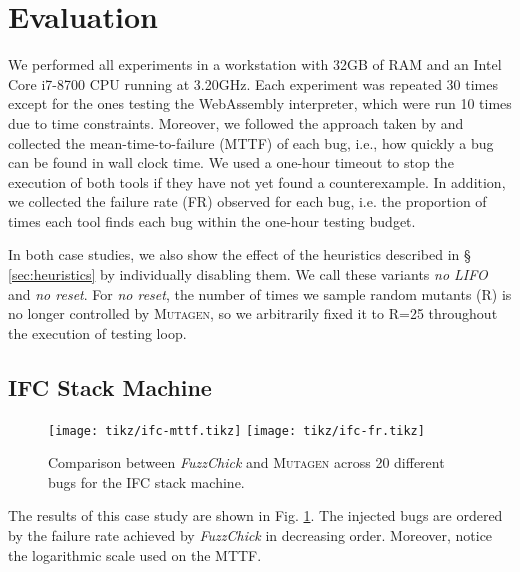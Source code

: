 \documentclass[sigconf,review,anonymous]{acmart}
\newcommand{\fuzzchick}{\textit{FuzzChick}\xspace}
\newcommand{\mutagen}{\textsc{Mutagen}\xspace}
\begin{document}

\section{Evaluation}
\label{sec:evaluation}

We performed all experiments in a workstation with 32GB of RAM and an Intel Core
i7-8700 CPU running at 3.20GHz.
%
Each experiment was repeated 30 times except for the ones testing the
WebAssembly interpreter, which were run 10 times due to time constraints.
%
Moreover, we followed the approach taken by
\citeauthor{lampropoulos2019coverage} and collected the mean-time-to-failure
(MTTF) of each bug, i.e., how quickly a bug can be found in wall clock time.
%
We used a one-hour timeout to stop the execution of both tools if they have not
yet found a counterexample.
%
In addition, we collected the failure rate (FR) observed for each bug, i.e. the
proportion of times each tool finds each bug within the one-hour testing budget.
%

In both case studies, we also show the effect of the heuristics described in \S
\ref{sec:heuristics} by individually disabling them.
%
We call these variants \textit{no LIFO} and \textit{no reset}.
%
For \textit{no reset}, the number of times we sample random mutants (R) is no
longer controlled by \mutagen, so we arbitrarily fixed it to R=25 throughout the
execution of testing loop.

\subsection{IFC Stack Machine}

\begin{figure}[b]
  \centering
  \texttt{[image: tikz/ifc-mttf.tikz]}
  \texttt{[image: tikz/ifc-fr.tikz]}
  \vspace{-20pt}
  \caption{\label{fig:results:ifc} Comparison between \fuzzchick and \mutagen
    across 20 different bugs for the IFC stack machine. }
\vspace{-5pt}
\end{figure}


The results of this case study are shown in Fig. \ref{fig:results:ifc}.
%
%
The injected bugs are ordered by the failure rate achieved by \fuzzchick in
decreasing order.
%
Moreover, notice the logarithmic scale used on the MTTF.
\end{document}
